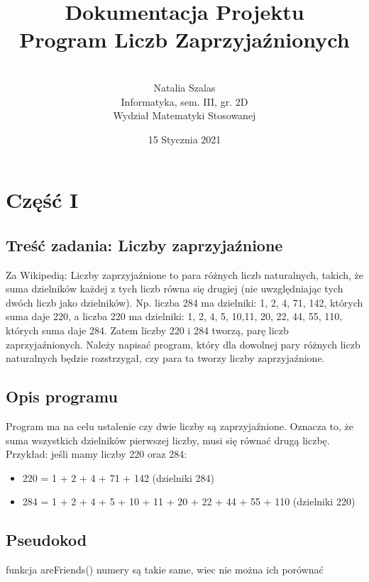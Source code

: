 \documentclass[12pt,a4paper]{article}
\title{\textbf{Dokumentacja Projektu\\ Program Liczb Zaprzyjaźnionych}}
\author{\\Natalia Szalas\\ Informatyka, sem. III, gr. 2D\\Wydział Matematyki Stosowanej}
\date{15 Stycznia 2021}
\begin{document}
\maketitle
\newpage
\tableofcontents

\newpage
	\section{Część I}
	\subsection{Treść zadania: Liczby zaprzyjaźnione}
	\hspace{20} Za Wikipedią: Liczby zaprzyjaźnione to para różnych liczb naturalnych, takich, że suma dzielników każdej z tych liczb równa się drugiej (nie uwzględniając tych dwóch liczb jako dzielników). Np. liczba 284 ma dzielniki: 1, 2, 4, 71, 142, których suma daje 220, a liczba 220 ma dzielniki: 1, 2, 4, 5, 10,11, 20, 22, 44, 55, 110, których suma daje 284. Zatem liczby 220 i 284 tworzą, parę liczb zaprzyjaźnionych. Należy napisać program, który dla dowolnej pary różnych liczb naturalnych będzie rozstrzygał, czy para ta tworzy liczby zaprzyjaźnione. \newline
	
	\subsection{Opis programu}
	\hspace{20} Program ma na celu ustalenie czy dwie liczby są zaprzyjaźnione. Oznacza to, że suma wszystkich dzielników pierwszej liczby, musi się równać drugą liczbę. Przykład: jeśli mamy liczby 220 oraz 284:
	\begin{itemize}
	    \item 220 = 1 + 2 + 4 + 71 + 142 (dzielniki 284)
	    \item 284 = 1 + 2 + 4 + 5 + 10 + 11 + 20 + 22 + 44 + 55 + 110 (dzielniki 220) \newline
	\end{itemize}
	
	\subsection{Pseudokod}
	
	\begin{algorithm}[H]
	\SetAlgoLined
	 {funkcja areFriends()}\;
	 {
	 numery są takie same, wiec nie można ich porównać}\;
  

\end{algorithm}
\end{document}
